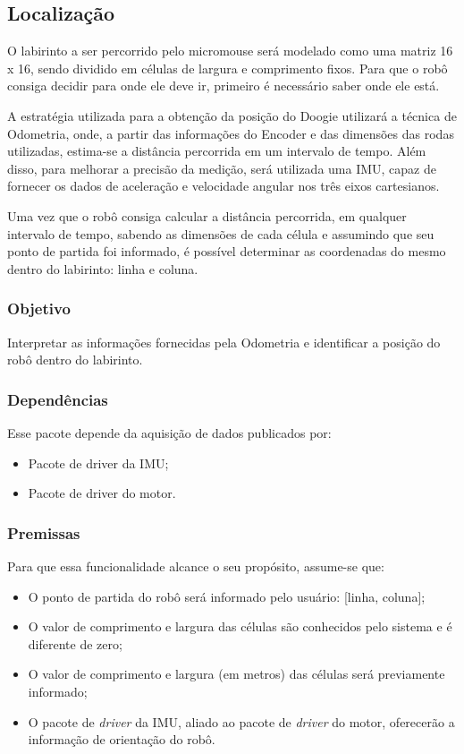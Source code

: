 \subsection{Localização}
\label{ssec:funcionalidade_localizacao}
O labirinto a ser percorrido pelo micromouse será modelado como uma matriz 16 x 16, sendo dividido em células de largura e comprimento fixos. Para que o robô consiga decidir para onde ele deve ir, primeiro é necessário saber onde ele está.

A estratégia utilizada para a obtenção da posição do Doogie utilizará a técnica de Odometria, onde, a partir das informações do Encoder e das dimensões das rodas utilizadas, estima-se a distância percorrida em um intervalo de tempo. Além disso, para melhorar a precisão da medição, será utilizada uma IMU, capaz de fornecer os dados de aceleração e velocidade angular nos três eixos cartesianos.

Uma vez que o robô consiga calcular a distância percorrida, em qualquer intervalo de tempo, sabendo as dimensões de cada célula e assumindo que seu ponto de partida foi informado, é possível determinar as coordenadas do mesmo dentro do labirinto: linha e coluna. 

\subsubsection{Objetivo}
Interpretar as informações fornecidas pela Odometria e identificar a posição do robô dentro do labirinto.

\subsubsection{Dependências}
Esse pacote depende da aquisição de dados publicados por:
\begin{itemize}
	\item Pacote de driver da IMU;
	\item Pacote de driver do motor.
\end{itemize}
	
\subsubsection{Premissas}
Para que essa funcionalidade alcance o seu propósito, assume-se que:
\begin{itemize}
	\item O ponto de partida do robô será informado pelo usuário: [linha, coluna];
	\item O valor de comprimento e largura das células são conhecidos pelo sistema e é diferente de zero;
	\item O valor de comprimento e largura (em metros) das células será previamente informado;
	\item O pacote de \textit{driver} da IMU, aliado ao pacote de \textit{driver} do motor, oferecerão a informação de orientação do robô.
\end{itemize}


